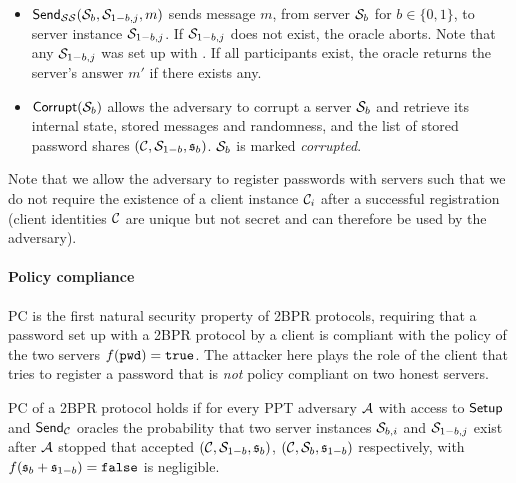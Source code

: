 \begin{itemize}
  \item $\mathsf{Send}_{\mathcal{S}\mathcal{S}}(\mathcal{S}_{b},\mathcal{S}_{1-b,j},m)$ sends message $m$, from server $\mathcal{S}_{b}$ for $b\in\{0,1\}$, to server instance $\mathcal{S}_{1-b,j}$.
        If $\mathcal{S}_{1-b,j}$ does not exist, the oracle aborts.
        Note that any $\mathcal{S}_{1-b,j}$ was set up with \Setup.
        If all participants exist, the oracle returns the server's answer $m'$ if there exists any.

  \item $\mathsf{Corrupt}(\mathcal{S}_{b})$ allows the adversary to corrupt a server $\mathcal{S}_b$ and retrieve its internal state, \ie stored messages and randomness, and the list of stored password shares $(\mathcal{C}, \mathcal{S}_{1-b}, \mathfrak{s}_b)$. %
      $\mathcal{S}_b$ is marked \emph{corrupted}.
\end{itemize}

\noindent
Note that we allow the adversary to register passwords with servers such that we do not require the existence of a client instance $\mathcal{C}_i$ after a successful registration (client identities $\mathcal{C}$ are unique but not secret and can therefore be used by the adversary).

\paragraph{Policy compliance}
\ac{PC} is the first natural security property of \ac{2BPR} protocols, requiring that a password set up with a \ac{2BPR} protocol by a client is compliant with the policy of the two servers $f(\mathtt{pwd})=\mathtt{true}$.
The attacker here plays the role of the client that tries to register a password \pwd that is \emph{not} policy compliant on two honest servers.


\begin{definition}\label{def:pc}
\acl{PC} of a \ac{2BPR} protocol holds if for every \ac{PPT} adversary $\mathcal{A}$ with access to $\mathsf{Setup}$ and $\mathsf{Send}_\mathcal{C}$ oracles the probability that two server instances $\mathcal{S}_{b,i}$ and $\mathcal{S}_{1-b,j}$ exist after $\mathcal{A}$ stopped that accepted $(\mathcal{C},\mathcal{S}_{1-b},\mathfrak{s}_b)$, $(\mathcal{C},\mathcal{S}_{b},\mathfrak{s}_{1-b})$ respectively, with $f(\mathfrak{s}_b+\mathfrak{s}_{1-b})=\mathtt{false}$ is negligible.
\eod
\end{definition}


